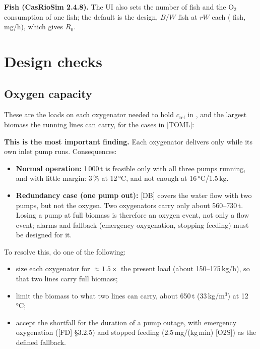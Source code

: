 \documentclass[11pt]{article}
\begin{document}


\textbf{Fish (CasRioSim 2.4.8).} The UI also sets the number of fish and the O$_2$ consumption of
one fish; the default is the design, $B/W$ fish at $rW$ each (\CASFishCount{} fish,
\CASFishOtwo\,mg/h), which gives $R_0$.

\section{Design checks}\label{sec:checks}

\subsection{Oxygen capacity}
These are the loads on each oxygenator needed to hold $c_\text{ref}$ in \CASNomMode{}, and
the largest biomass the running lines can carry, for the cases in [TOML]:
\begin{center}

\end{center}
\textbf{This is the most important finding.} Each oxygenator delivers only while its own inlet
pump runs. Consequences:
\begin{itemize}
  \item \textbf{Normal operation:} 1\,000\,t is feasible only with all three pumps running, and
        with little margin: 3\,\% at 12\,°C, and not enough at 16\,°C/1.5\,kg.
  \item \textbf{Redundancy case (one pump out):} [DB] covers the water flow with two pumps, but
        not the oxygen. Two oxygenators carry only about 560--730\,t. Losing a pump at full
        biomass is therefore an oxygen event, not only a flow event; alarms and fallback
        (emergency oxygenation, stopping feeding) must be designed for it.
\end{itemize}
To resolve this, do one of the following:
\begin{itemize}
  \item size each oxygenator for $\approx 1.5\times$ the present load (about 150--175\,kg/h), so
        that two lines carry full biomass;
  \item limit the biomass to what two lines can carry, about 650\,t (33\,kg/m$^3$) at 12\,°C;
  \item accept the shortfall for the duration of a pump outage, with emergency oxygenation
        ([FD] §3.2.5) and stopped feeding (2.5\,mg/(kg\,min) [O2S]) as the defined fallback.
\end{itemize}
\end{document}
